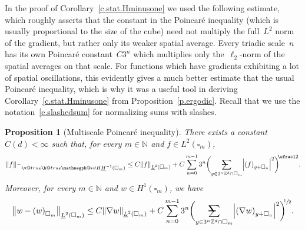 \documentclass[11pt]{article} %
\makeatletter
\let\oldsquare\square %
\renewcommand{\square}{\oldsquare}
\numberwithin{equation}{section}
\newtheorem{proposition}[theorem]{Proposition}
\theoremstyle{definition}
\let\originalleft\left
\let\originalright\right
\renewcommand{\left}{\mathopen{}\mathclose\bgroup\originalleft}
\renewcommand{\right}{\aftergroup\egroup\originalright}
\newcommand*{\N}{\ensuremath{\mathbb{N}}}
\newcommand*{\Zd}{\ensuremath{\mathbb{Z}^d}}
\renewcommand*{\hat}{\widehat}
\newcommand{\cu}{\square}
\newcommand{\avsum}{\mathop{\mathpalette\avsuminner\relax}\displaylimits}
\newcommand\avsuminner[2]{%
  {\sbox0{$\m@th#1\sum$}%
   \vphantom{\usebox0}%
   \ooalign{%
     \hidewidth
     \smash{\,\rule[.23em]{8.8pt}{1.1pt} \relax}%
     \hidewidth\cr
     $\m@th#1\sum$\cr
   }%
  }%
}
\newcommand{\negphantom}{\v@true\h@true\negph@nt}
\newcommand{\negph@nt}{\ifmmode\expandafter\mathpalette 
  \expandafter\mathnegph@nt\else\expandafter\makenegph@nt\fi}
\newcommand{\makenegph@nt}[1]{%
  \setbox\z@\hbox{\color@begingroup#1\color@endgroup}\finnegph@nt}
\newcommand{\finnegph@nt}{%
  \setbox\tw@\null 
  \ifv@ \ht\tw@\ht\z@\dp\tw@\dp\z@\fi \ifh@\wd\tw@-\wd\z@\fi\box\tw@}
\newcommand{\mathnegph@nt}[2]{%
  \setbox\z@\hbox{$\m@th #1{#2}$}\finnegph@nt}
\newcommand{\Hminusul}{\hat{\phantom{H}}\negphantom{H}\underline{H}^{-1}}
\makeatother
\begin{document}
In the proof of Corollary~\ref{c.stat.Hminusone} we used the following estimate, which roughly asserts that the constant in the Poincar\'e inequality (which is usually proportional to the size of the cube) need not multiply the full~$L^2$ norm of the gradient, but rather only its weaker spatial average. Every triadic scale~$n$ has its own Poincar\'e constant~$C3^n$ which multiplies only the~$\ell_2$-norm of the spatial averages on that scale. For functions which have gradients exhibiting a lot of spatial oscillations, this evidently gives a much better estimate that the usual Poincar\'e inequality, which is why it was a useful tool in deriving Corollary~\ref{c.stat.Hminusone} from Proposition~\ref{p.ergodic}. Recall that we use the notation~\eqref{e.slashedsum} for normalizing sums with slashes. 

\begin{proposition}[Multiscale Poincar\'e inequality]
\label{p.MSP}
There exists a constant~$C(d)<\infty$ such that, for every $m \in \N$ and $f\in L^2(\cu_m)$, 
\begin{equation}
\label{e.MSP}
\left\| f \right\|_{\Hminusul(\cu_m)}
\leq
C
\left\| f \right\|_{ \underline{L}^2(\cu_m)} 
+
C 
\sum_{n=0}^{{m-1}} 3^{n} 
\biggl( \avsum_{y\in 3^n\Zd\cap \cu_{m}} 
\left| \left( f \right)_{y+\cu_n} \right|^2 \biggr)^{\!\!\sfrac12}. 
\end{equation}
Moreover, for every $m \in \N$ and $w \in H^1(\cu_{m})$, we have
\begin{equation} 
\label{e.MSPw}
\left\| w - \left( w \right)_{\cu_{m}} \right\|_{\underline{L}^2(\cu_{m}) }
\leq 
C \left\| \nabla w \right\|_{\underline{L}^2(\cu_{m}) } 
+ 
C \sum_{n=0}^{{m-1}} 3^{n} 
\biggl( 
\avsum_{y\in 3^n\Zd\cap \cu_{m}} 
\left| \left( \nabla w \right)_{y+\cu_n} \right|^2
\biggr)^{\!\!\sfrac12}
.
\end{equation}

\end{proposition}
\end{document}
